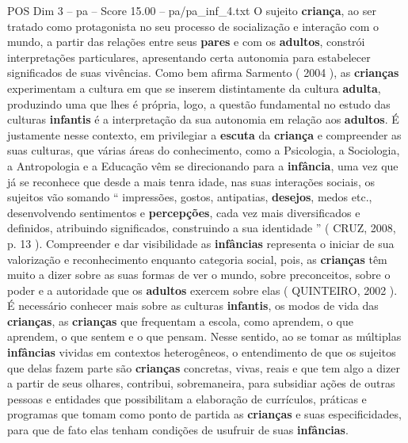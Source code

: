 \begin{textsample}{POS Dim 3 – pa – Score 15.00 – pa/pa\_inf\_4.txt}
O sujeito \textbf{criança}, ao ser tratado como protagonista no seu processo de socialização e interação com o mundo, a partir das relações entre seus \textbf{pares} e com os \textbf{adultos}, constrói interpretações particulares, apresentando certa autonomia para estabelecer significados de suas vivências.
Como bem afirma Sarmento ( 2004 ), as \textbf{crianças} experimentam a cultura em que se inserem distintamente da cultura \textbf{adulta}, produzindo uma que lhes é própria, logo, a questão fundamental no estudo das culturas \textbf{infantis} é a interpretação da sua autonomia em relação aos \textbf{adultos}.
É justamente nesse contexto, em privilegiar a \textbf{escuta} da \textbf{criança} e compreender as suas culturas, que várias áreas do conhecimento, como a Psicologia, a Sociologia, a Antropologia e a Educação vêm se direcionando para a \textbf{infância}, uma vez que já se reconhece que desde a mais tenra idade, nas suas interações sociais, os sujeitos vão somando “ impressões, gostos, antipatias, \textbf{desejos}, medos etc., desenvolvendo sentimentos e \textbf{percepções}, cada vez mais diversificados e definidos, atribuindo significados, construindo a sua identidade ” ( CRUZ, 2008, p. 13 ).
Compreender e dar visibilidade as \textbf{infâncias} representa o iniciar de sua valorização e reconhecimento enquanto categoria social, pois, as \textbf{crianças} têm muito a dizer sobre as suas formas de ver o mundo, sobre preconceitos, sobre o poder e a autoridade que os \textbf{adultos} exercem sobre elas ( QUINTEIRO, 2002 ).
É necessário conhecer mais sobre as culturas \textbf{infantis}, os modos de vida das \textbf{crianças}, as \textbf{crianças} que frequentam a escola, como aprendem, o que aprendem, o que sentem e o que pensam.
Nesse sentido, ao se tomar as múltiplas \textbf{infâncias} vividas em contextos heterogêneos, o entendimento de que os sujeitos que delas fazem parte são \textbf{crianças} concretas, vivas, reais e que tem algo a dizer a partir de seus olhares, contribui, sobremaneira, para subsidiar ações de outras pessoas e entidades que possibilitam a elaboração de currículos, práticas e programas que tomam como ponto de partida as \textbf{crianças} e suas especificidades, para que de fato elas tenham condições de usufruir de suas \textbf{infâncias}.

\end{textsample}
